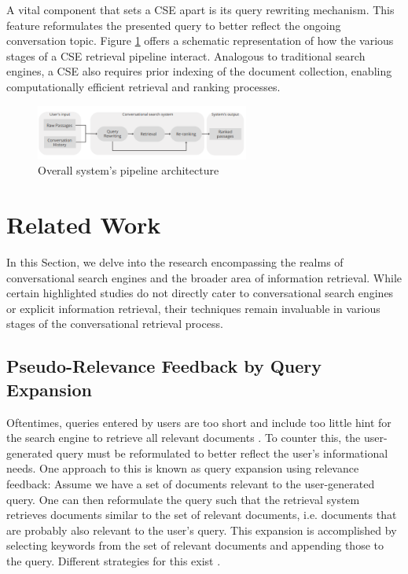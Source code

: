 \documentclass[sigconf]{acmart}
\begin{document}
A vital component that sets a CSE apart is its query rewriting mechanism. This feature reformulates the presented query to better reflect the ongoing conversation topic. Figure \ref{figure:global_pipeline} offers a schematic representation of how the various stages of a CSE retrieval pipeline interact. Analogous to traditional search engines, a CSE also requires prior indexing of the document collection, enabling computationally efficient retrieval and ranking processes.

\begin{figure}[h]
	\includegraphics[width=7cm]{pipeline.png}
	\caption{Overall system's pipeline architecture}
	\label{figure:global_pipeline}
\end{figure}


\section{Related Work}\label{sec:related}
In this Section, we delve into the research encompassing the realms of conversational search engines and the broader area of information retrieval. While certain highlighted studies do not directly cater to conversational search engines or explicit information retrieval, their techniques remain invaluable in various stages of the conversational retrieval process.

\subsection{Pseudo-Relevance Feedback by Query Expansion}\label{sec:prf}
Oftentimes, queries entered by users are too short and include too little hint for the search engine to retrieve all relevant documents \cite{vaidyanathan2015query}. To counter this, the user-generated query must be reformulated to better reflect the user's informational needs. One approach to this is known as query expansion using relevance feedback: Assume we have a set of documents relevant to the user-generated query. One can then reformulate the query such that the retrieval system retrieves documents similar to the set of relevant documents, i.e. documents that are probably also relevant to the user's query. This expansion is accomplished by selecting keywords from the set of relevant documents and appending those to the query. Different strategies for this exist \cite{vaidyanathan2015query}.
\end{document}
